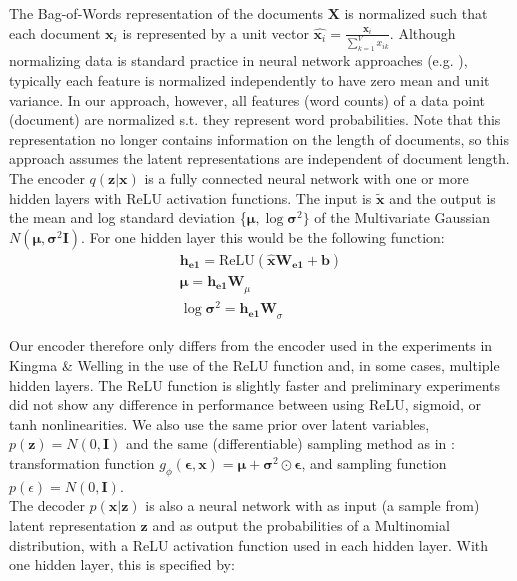 \documentclass{report}
\begin{document}
The Bag-of-Words representation of the documents ${\mathbf{X}}$ is normalized such that each document $\mathbf{x}_i$ is represented by a unit vector $\hat{\mathbf{x}_i} = \frac{\mathbf{x}_i}{\sum_{k=1}^{V}x_{ik}}$. Although normalizing data is standard practice in neural network approaches (e.g. \cite{bishop1995neural}), typically each feature is normalized independently to have zero mean and unit variance. In our approach, however, all features (word counts) of a data point (document) are normalized s.t. they represent word probabilities.  Note that this representation no longer contains information on the length of documents, so this approach assumes the latent representations are independent of document length.
\\
The encoder $q(\mathbf{z}|\mathbf{x})$ is a fully connected neural network with one or more hidden layers with ReLU activation functions. The input is $\tilde{\mathbf{x}}$ and the output is the mean and log standard deviation \{$\boldsymbol{\mu}, \log \boldsymbol{\sigma} ^2\}$ of the Multivariate Gaussian $N(\boldsymbol{\mu}, \boldsymbol{\sigma} ^2\textbf{I})$. For one hidden layer this would be the following function:
\begin{align}
\mathbf{h_{e1}} = \text{ReLU}(\mathbf{\hat{x}}\mathbf{W_{e1}} + \mathbf{b}) \label{he1}\\
\boldsymbol{\mu} = \mathbf{h_{e1}W}_{\mu} \label{vae_encoding_mu} \\
\log \boldsymbol{\sigma}^2 = \mathbf{h_{e1}W}_{\sigma} \label{vae_encoding_sig}
\end{align} 


Our encoder therefore only differs from the encoder used in the experiments in Kingma \& Welling \cite{kingma2013auto} in the use of the ReLU function and, in some cases, multiple hidden layers. The ReLU function is slightly faster and preliminary experiments did not show any difference in performance between using ReLU, sigmoid, or tanh nonlinearities. We also use the same prior over latent variables, $p(\mathbf{z}) = N(0,\textbf{I})$ and the same (differentiable) sampling method as in \cite{kingma2013auto}: transformation function $g_\phi(\boldsymbol{\epsilon},\mathbf{x}) = \boldsymbol{\mu} + \boldsymbol{\sigma}^2\odot \boldsymbol{\epsilon}$, and sampling function $p(\epsilon) = N(0,\textbf{I})$. \\
The decoder $p(\mathbf{x}|\mathbf{z})$ is also a neural network with as input (a sample from) latent representation $\mathbf{z}$ and as output the probabilities of a Multinomial distribution, with a ReLU activation function used in each hidden layer. With one hidden layer, this is specified by:
\end{document}
